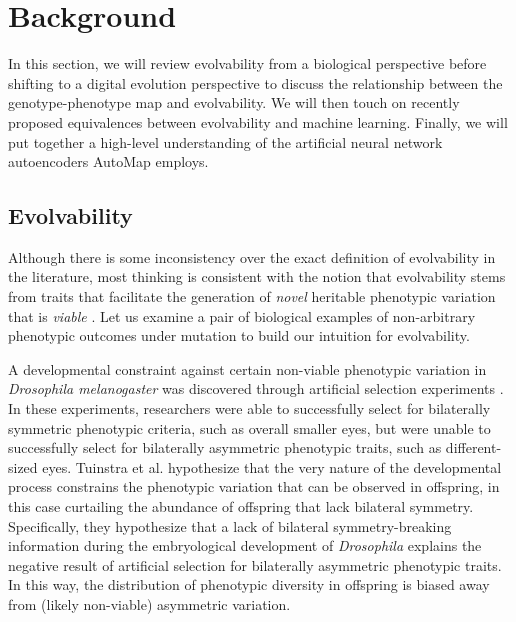 \section{Background} \label{sec:background}

In this section, we will review evolvability from a biological perspective before shifting to a digital evolution perspective to discuss the relationship between the genotype-phenotype map and evolvability.
We will then touch on recently proposed equivalences between evolvability and machine learning.
Finally, we will put together a high-level understanding of the artificial neural network autoencoders AutoMap employs.

\subsection{Evolvability}
Although there is some inconsistency over the exact definition of evolvability in the literature, most thinking is consistent with the notion that evolvability stems from traits that facilitate the generation of \textit{novel} heritable phenotypic variation that is \textit{viable} \cite{tarapore2015evolvability}.
Let us examine a pair of biological examples of non-arbitrary phenotypic outcomes under mutation to build our intuition for evolvability.

A developmental constraint against certain non-viable phenotypic variation in  \textit{Drosophila melanogaster} was discovered through artificial selection experiments \cite{coyne1987lack, tuinstra1990lack}.
In these experiments,  researchers were able to successfully select for bilaterally symmetric phenotypic criteria, such as overall smaller eyes, but were unable to successfully select for bilaterally asymmetric phenotypic traits, such as different-sized eyes.
Tuinstra et al. hypothesize that the very nature of the developmental process constrains the phenotypic variation that can be observed in offspring, in this case curtailing the abundance of offspring that lack bilateral symmetry.
Specifically, they hypothesize that a lack of bilateral symmetry-breaking information during the embryological development of \textit{Drosophila} explains the negative result of artificial selection for bilaterally asymmetric phenotypic traits.
In this way, the distribution of phenotypic diversity in offspring is biased away from (likely non-viable) asymmetric variation.

